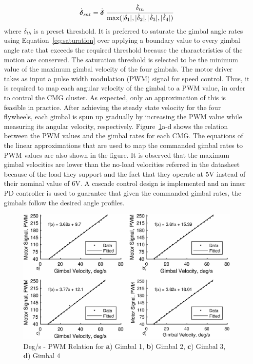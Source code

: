 \documentclass[aerospace,article,submit,moreauthors,dvi2pdf]{Definitions/mdpi}
\begin{document}
\begin{equation}
\dot{\boldsymbol{\delta}}_{sat}=\dot{\boldsymbol{\delta}}\hspace{0.1cm}\frac{\dot{{\delta}}_{th}}{\max(|\dot{\delta}_1|,|\dot{\delta}_2|,|\dot{\delta}_3|,|\dot{\delta}_4|)}
\label{eq:saturation}
\end{equation}
where $\dot{{\delta}}_{th}$ is a preset threshold.
It is preferred to saturate the gimbal angle rates using Equation~\ref{eq:saturation} over applying a boundary value to every gimbal angle rate that exceeds the required threshold because the characteristics of the motion are conserved. The saturation threshold is selected to be the minimum value of the maximum gimbal velocity of the four gimbals.
The motor driver takes as input a pulse width modulation (PWM) signal for speed control. Thus, it is required to map each angular velocity of the gimbal to a PWM value, in order to control the CMG cluster. As expected, only an approximation of this is feasible in practice. After achieving the steady state velocity for the four flywheels, each gimbal is spun up gradually by increasing the PWM value while measuring its angular velocity, respectively.  Figure~\ref{fig:degpersec2pwm}a-d shows the relation between the PWM values and the gimbal rates for each CMG.
The equations of the linear approximations that are used to map the commanded gimbal rates to PWM values are also shown in the figure. It is observed that the maximum gimbal velocities are lower than the no-load velocities referred in the datasheet because of the load they support and the fact that they operate at 5V instead of their nominal value of 6V. A cascade control design is implemented and an inner PD controller is used to guarantee that given the commanded gimbal rates, the gimbals follow the desired angle profiles.

\begin{figure}[H]
\includegraphics[width=13cm]{degpersec2pwm.eps}
\caption{Deg/s - PWM Relation for \textbf{a}) Gimbal 1, \textbf{b}) Gimbal 2, \textbf{c}) Gimbal 3, \textbf{d}) Gimbal 4 \label{fig:degpersec2pwm}}
\end{figure}
\end{document}
